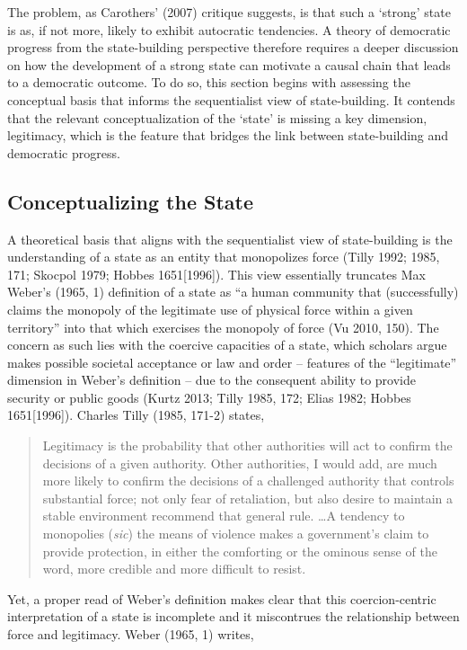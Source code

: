\documentclass [11pt]{article}
\begin{document}
The problem, as Carothers' (2007) critique suggests, is that such a `strong' state is as, if not more, likely to exhibit autocratic tendencies. A theory of democratic progress from the state-building perspective therefore requires a deeper discussion on how the development of a strong state can motivate a causal chain that leads to a democratic outcome. To do so, this section begins with assessing the conceptual basis that informs the sequentialist view of state-building. It contends that the relevant conceptualization of the `state' is missing a key dimension, legitimacy, which is the feature that bridges the link between state-building and democratic progress.

\subsection*{Conceptualizing the State}

A theoretical basis that aligns with the sequentialist view of state-building is the understanding of a state as an entity that monopolizes force (Tilly 1992; 1985, 171; Skocpol 1979; Hobbes 1651[1996]). This view essentially truncates Max Weber's (1965, 1) definition of a state as “a human community that (successfully) claims the monopoly of the legitimate use of physical force within a given territory” into that which exercises the monopoly of force (Vu 2010, 150). The concern as such lies with the coercive capacities of a state, which scholars argue makes possible societal acceptance or law and order -- features of the ``legitimate'' dimension in Weber's definition -- due to the consequent ability to provide security or public goods (Kurtz 2013; Tilly 1985, 172; Elias 1982; Hobbes 1651[1996]). Charles Tilly (1985, 171-2) states,

\begin{quote}
\small
Legitimacy is the probability that other authorities will act to confirm the decisions of a given authority. Other authorities, I would add, are much more likely to confirm the decisions of a challenged authority that controls substantial force; not only fear of retaliation, but also desire to maintain a stable environment recommend that general rule. \dots A tendency to monopolies (\emph{sic}) the means of violence makes a government's claim to provide protection, in either the comforting or the ominous sense of the word, more credible and more difficult to resist.
\end{quote}

Yet, a proper read of Weber's definition makes clear that this coercion-centric interpretation of a state is incomplete and it miscontrues the relationship between force and legitimacy. Weber (1965, 1) writes,
\end{document}
